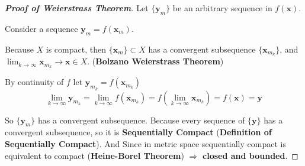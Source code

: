 \begin{proof}[\textbf{Proof of Weierstrass Theorem}]
    Let \(\{\mathbf{y}_m\}\) be an arbitrary sequence in \(f(\mathbf{x})\).

    Consider a sequence \(\mathbf{y}_m=f(\mathbf{x}_m)\).

    Because \( X \) is compact, then \( \{\mathbf{x}_m\} \subset X \) has a convergent subsequence \( \{\mathbf{x}_{m_k}\} \), and \( \lim_{k \to \infty} \mathbf{x}_{m_k} \to \mathbf{x} \in X \). (\textbf{Bolzano Weierstrass Theorem})

    By continuity of \( f \) let \( \mathbf{y}_{m_k} = f(\mathbf{x}_{m_k}) \)
    \[
        \lim_{k \to \infty} \mathbf{y}_{m_k} = \lim_{k \to \infty} f(\mathbf{x}_{m_k}) = f(\lim_{k \to \infty} \mathbf{x}_{m_k}) = f(\mathbf{x}) = \mathbf{y}
    \]

    So \(\{\mathbf{y}_m\}\) has a convergent subsequence. Because every sequence of \(\{\mathbf{y}\}\) has a convergent subsequence, so it is \textbf{Sequentially Compact} (\textbf{Definition of Sequentially Compact}). And Since in metric space sequentially compact is equivalent to compact (\textbf{Heine-Borel Theorem}) \( \Longrightarrow \) \textbf{closed and bounded}.
\end{proof}
